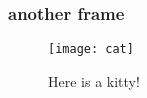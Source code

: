 \documentclass[main.tex]{subfiles}
\begin{document}
\begin{frame}
  \frametitle{another frame}
  \begin{figure}[h]
    \centering
    \texttt{[image: cat]}
    \caption{Here is a kitty!}
  \end{figure}
\end{frame}
\end{document}
